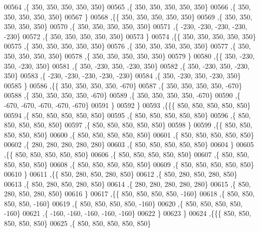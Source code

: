 \begin{DoxyCode}
00564    ,\{   350,   350,   350,   350,   350\}
00565    ,\{   350,   350,   350,   350,   350\}
00566    ,\{   350,   350,   350,   350,   350\}
00567    \}
00568   ,\{\{   350,   350,   350,   350,   350\}
00569    ,\{   350,   350,   350,   350,   350\}
00570    ,\{   350,   350,   350,   350,   350\}
00571    ,\{  -230,  -230,  -230,  -230,  -230\}
00572    ,\{   350,   350,   350,   350,   350\}
00573    \}
00574   ,\{\{   350,   350,   350,   350,   350\}
00575    ,\{   350,   350,   350,   350,   350\}
00576    ,\{   350,   350,   350,   350,   350\}
00577    ,\{   350,   350,   350,   350,   350\}
00578    ,\{   350,   350,   350,   350,   350\}
00579    \}
00580   ,\{\{   350,  -230,   350,  -230,   350\}
00581    ,\{   350,  -230,   350,  -230,   350\}
00582    ,\{   350,  -230,   350,  -230,   350\}
00583    ,\{  -230,  -230,  -230,  -230,  -230\}
00584    ,\{   350,  -230,   350,  -230,   350\}
00585    \}
00586   ,\{\{   350,   350,   350,   350,  -670\}
00587    ,\{   350,   350,   350,   350,  -670\}
00588    ,\{   350,   350,   350,   350,  -670\}
00589    ,\{   350,   350,   350,   350,  -670\}
00590    ,\{  -670,  -670,  -670,  -670,  -670\}
00591    \}
00592   \}
00593  ,\{\{\{   850,   850,   850,   850,   850\}
00594    ,\{   850,   850,   850,   850,   850\}
00595    ,\{   850,   850,   850,   850,   850\}
00596    ,\{   850,   850,   850,   850,   850\}
00597    ,\{   850,   850,   850,   850,   850\}
00598    \}
00599   ,\{\{   850,   850,   850,   850,   850\}
00600    ,\{   850,   850,   850,   850,   850\}
00601    ,\{   850,   850,   850,   850,   850\}
00602    ,\{   280,   280,   280,   280,   280\}
00603    ,\{   850,   850,   850,   850,   850\}
00604    \}
00605   ,\{\{   850,   850,   850,   850,   850\}
00606    ,\{   850,   850,   850,   850,   850\}
00607    ,\{   850,   850,   850,   850,   850\}
00608    ,\{   850,   850,   850,   850,   850\}
00609    ,\{   850,   850,   850,   850,   850\}
00610    \}
00611   ,\{\{   850,   280,   850,   280,   850\}
00612    ,\{   850,   280,   850,   280,   850\}
00613    ,\{   850,   280,   850,   280,   850\}
00614    ,\{   280,   280,   280,   280,   280\}
00615    ,\{   850,   280,   850,   280,   850\}
00616    \}
00617   ,\{\{   850,   850,   850,   850,  -160\}
00618    ,\{   850,   850,   850,   850,  -160\}
00619    ,\{   850,   850,   850,   850,  -160\}
00620    ,\{   850,   850,   850,   850,  -160\}
00621    ,\{  -160,  -160,  -160,  -160,  -160\}
00622    \}
00623   \}
00624  ,\{\{\{   850,   850,   850,   850,   850\}
00625    ,\{   850,   850,   850,   850,   850\}

\end{DoxyCode}
